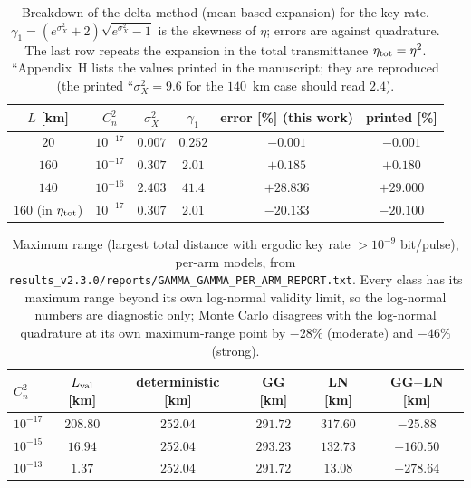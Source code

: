\begin{table}[htbp]
\centering\small
\caption{Breakdown of the delta method (mean-based expansion) for the key rate. $\gamma_1=(e^{\sigma_X^2}+2)\sqrt{e^{\sigma_X^2}-1}$ is the skewness of $\eta$; errors are against quadrature. The last row repeats the expansion in the total transmittance $\eta_{\rm tot}=\eta^2$. ``Appendix~H lists the values printed in the manuscript; they are reproduced (the printed ``$\sigma_X^2=9.6$ for the $140$~km case should read $2.4$).}
\label{tab:delta}
\begin{tabular}{cccccc}
\toprule
$L$ [km] & $C_n^2$ & $\sigma_X^2$ & $\gamma_1$ & error [\%] (this work) & printed [\%]\\
\midrule
$20$ & $10^{-17}$ & $0.007$ & $0.252$ & $-0.001$ & $-0.001$ \\
$160$ & $10^{-17}$ & $0.307$ & $2.01$ & $+0.185$ & $+0.180$ \\
$140$ & $10^{-16}$ & $2.403$ & $41.4$ & $+28.836$ & $+29.000$ \\
$160$ (in $\eta_{\rm tot}$) & $10^{-17}$ & $0.307$ & $2.01$ & $-20.133$ & $-20.100$ \\

\bottomrule
\end{tabular}
\end{table}

\begin{table}[htbp]
\centering\small
\caption{Maximum range (largest total distance with ergodic key rate $>10^{-9}$ bit/pulse), per-arm models, from \texttt{results\_v2.3.0/reports/GAMMA\_GAMMA\_PER\_ARM\_REPORT.txt}. Every class has its maximum range beyond its own log-normal validity limit, so the log-normal numbers are diagnostic only; Monte Carlo disagrees with the log-normal quadrature at its own maximum-range point by $-28\%$ (moderate) and $-46\%$ (strong).}
\label{tab:range-ln}
\begin{tabular}{lccccc}
\toprule
$C_n^2$ & $L_{\rm val}$ [km] & deterministic [km] & GG [km] & LN [km] & GG$-$LN [km] \\
\midrule
$10^{-17}$ & $208.80$ & $252.04$ & $291.72$ & $317.60$ & $-25.88$ \\
$10^{-15}$ & $16.94$ & $252.04$ & $293.23$ & $132.73$ & $+160.50$ \\
$10^{-13}$ & $1.37$ & $252.04$ & $291.72$ & $13.08$ & $+278.64$ \\
\bottomrule
\end{tabular}
\end{table}
